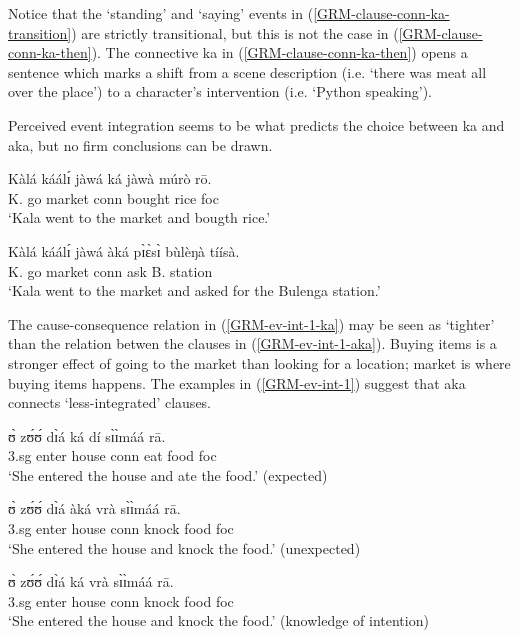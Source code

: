 Notice that the `standing' and `saying' events in
(\ref{GRM-clause-conn-ka-transition}) are strictly transitional, but this is not
the case in (\ref{GRM-clause-conn-ka-then}). The connective {\sls ka} in
(\ref{GRM-clause-conn-ka-then}) opens a sentence which marks a shift from a
scene description (i.e.  `there was meat all over the place') to a character's
intervention (i.e. `Python speaking').  

Perceived event integration  seems to be what predicts the choice between 
{\sls ka} and {\sls aka}, but no firm conclusions can be drawn. 

\ea\label{GRM-ev-int-1} 

\ea\label{GRM-ev-int-1-ka} 
\gll Kàlá káálɪ́ jàwá ká jàwà múrò rō.\\
K. go market {\sc conn} bought rice {\sc foc}\\
\glt  `Kala went to the market and bougth rice.'

\ex\label{GRM-ev-int-1-aka} 
\gll  Kàlá káálɪ́ jàwá àká pɪ̀ɛ̀sɪ̀ bùlèŋà tíísà.\\
K. go market {\sc conn} ask B. station\\
\glt  `Kala went to the market and asked for the Bulenga station.' 

\z 
 \z


The cause-consequence relation in (\ref{GRM-ev-int-1-ka}) may be seen as 
`tighter' than the relation betwen the clauses in (\ref{GRM-ev-int-1-aka}). 
Buying items is a stronger effect of going to the market than 
looking for a location; market is where buying items happens. The examples in 
(\ref{GRM-ev-int-1}) suggest that {\sls aka} connects `less-integrated' 
clauses. 
 
\ea\label{GRM-ev-int-2} 
 
\ea\label{GRM-ev-int-2-ka-1} 
\gll ʊ̀ zʊ́ʊ́ dɪ̀á ká dí sɪ̀ɪ̀máá rā.\\
 {\sc 3.sg} enter house {\sc conn} eat food  {\sc foc}\\
\glt `She entered the house and ate the food.' (expected)

\ex\label{GRM-ev-int-2-aka} 
\gll  ʊ̀ zʊ́ʊ́ dɪ̀á àká vrà sɪ̀ɪ̀máá rā.\\
{\sc 3.sg} enter house {\sc conn} knock food  {\sc foc}\\
\glt `She entered the house and knock the food.' (unexpected)

\ex\label{GRM-ev-int-2-ka} 
\gll ʊ̀ zʊ́ʊ́ dɪ̀á ká vrà sɪ̀ɪ̀máá rā.\\
{\sc 3.sg} enter house {\sc conn} knock food  {\sc foc}\\
\glt `She entered the house and knock the food.' (knowledge of intention)

